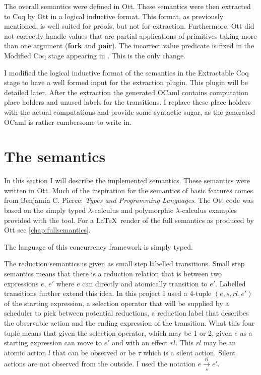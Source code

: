 \documentclass[12pt,twoside,notitlepage]{report}
\begin{document}
The overall semantics were defined in Ott. These semantics were then extracted to Coq by Ott in a logical inductive format. This format, as previously mentioned, is well suited for proofs, but not for extraction. Furthermore, Ott did not correctly handle values that are partial applications of primitives taking more than one argument (\textbf{fork} and \textbf{pair}). The incorrect value predicate is fixed in the Modified Coq stage appearing in . This is the only change.

I modified the logical inductive format of the semantics in the Extractable Coq stage to have a well formed input for the extraction plugin. This plugin will be detailed later. After the extraction the generated OCaml contains computation place holders and unused labels for the transitions. I replace these place holders with the actual computations and provide some syntactic sugar, as the generated OCaml is rather cumbersome to write in.
\section{The semantics}
In this section I will describe the implemented semantics. These semantics were written in Ott. Much of the inspiration for the semantics of basic features comes from Benjamin C. Pierce: \textit{Types and Programming Languages}\cite{pierce2002types}. The Ott code was based on the simply typed $ \lambda $-calculus and polymorphic $ \lambda $-calculus examples provided with the tool\cite{Ott}. For a \LaTeX\, render of the full semantics as produced by Ott see \cref{chap:fullsemantics}.

The language of this concurrency framework is simply typed. 

The reduction semantics is given as small step labelled transitions. Small step semantics means that there is a reduction relation that is between two expressions $ e, \, e' $ where $ e $ can directly and atomically transition to $ e' $. Labelled transitions further extend this idea. In this project I used a 4-tuple $ (e, s, rl, e') $ of the starting expression, a selection operator that will be supplied by a scheduler to pick between potential reductions, a reduction label that describes the observable action and the ending expression of the transition. What this four tuple means that given the selection operator, which may be 1 or 2, given $ e $ as a starting expression can move to $ e' $ and with an effect $ rl $. This $ rl $ may be an atomic action $ l $ that can be observed or be $ \tau $ which is a silent action. Silent actions are not observed from the outside. I used the notation $ e \overset{rl}{\underset{s}{\longrightarrow}} e' $.
 
\end{document}
